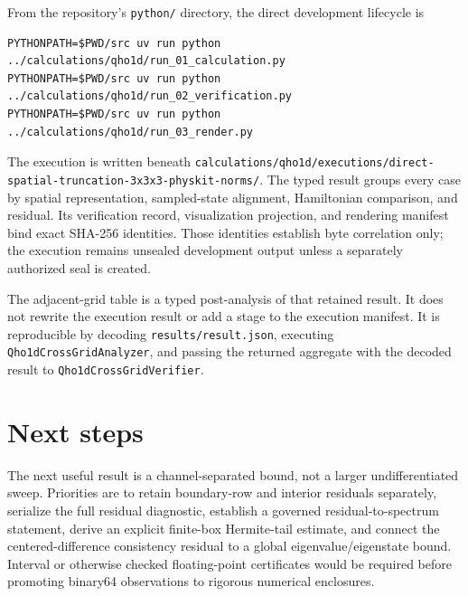 \documentclass[11pt]{article}
\newcommand{\code}[1]{\texttt{#1}}
\begin{document}
From the repository's \code{python/} directory, the direct development lifecycle is
\begin{verbatim}
PYTHONPATH=$PWD/src uv run python ../calculations/qho1d/run_01_calculation.py
PYTHONPATH=$PWD/src uv run python ../calculations/qho1d/run_02_verification.py
PYTHONPATH=$PWD/src uv run python ../calculations/qho1d/run_03_render.py
\end{verbatim}
The execution is written beneath
\code{calculations/qho1d/executions/direct-spatial-truncation-3x3x3-physkit-norms/}.
The
typed result groups every case by spatial representation, sampled-state alignment,
Hamiltonian comparison, and residual.  Its verification record, visualization
projection, and rendering manifest bind
exact SHA-256 identities.  Those identities establish byte correlation only; the
execution remains unsealed development output unless a separately authorized seal is
created.

The adjacent-grid table is a typed post-analysis of that retained result.  It does not
rewrite the execution result or add a stage to the execution manifest.  It is
reproducible by decoding \code{results/result.json}, executing
\code{Qho1dCrossGridAnalyzer}, and passing the returned aggregate with the decoded
result to \code{Qho1dCrossGridVerifier}.

\section{Next steps}

The next useful result is a channel-separated bound, not a larger undifferentiated
sweep.  Priorities are to retain boundary-row and interior residuals separately,
serialize the full residual diagnostic, establish a governed residual-to-spectrum
statement, derive an explicit finite-box Hermite-tail estimate, and connect the
centered-difference consistency residual to a global eigenvalue/eigenstate bound.
Interval or otherwise checked floating-point certificates would be required before
promoting binary64 observations to rigorous numerical enclosures.



\end{document}
